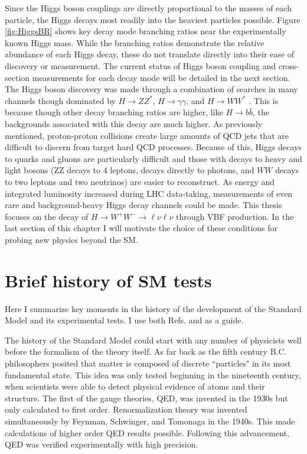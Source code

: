 Since the Higgs boson couplings are directly proportional to the masses of each particle, the Higgs decays most readily into the heaviest particles possible. Figure \ref{fig:HiggsBR} shows key decay mode branching ratios near the experimentally known Higgs mass. While the branching ratios demonstrate the relative abundance of each Higgs decay, these do not translate directly into their ease of discovery or measurement. The current status of Higgs boson coupling and cross-section measurements for each decay mode will be detailed in the next section. The Higgs boson discovery was made through a combination of searches in many channels though dominated by $H\rightarrow ZZ^*$, $H\rightarrow\gamma\gamma$, and $H\rightarrow WW^*$ \cite{Higgsdiscovery}. This is because though other decay branching ratios are higher, like $H\rightarrow b\bar{b}$, the backgrounds associated with this decay are much higher. As previously mentioned, proton-proton collisions create large amounts of QCD jets that are difficult to discern from target hard QCD processes. Because of this, Higgs decays to quarks and gluons are particularly difficult and those with decays to heavy and light bosons (ZZ decays to 4 leptons, decays directly to photons, and $WW$ decays to two leptons and two neutrinos) are easier to reconstruct. As energy and integrated luminosity increased during LHC data-taking, measurements of even rare and background-heavy Higgs decay channels could be made.  This thesis focuses on the decay of $H\rightarrow W^+W^-\rightarrow \ell\nu\ell\nu$ through VBF production. In the last section of this chapter I will motivate the choice of these conditions for probing new physics beyond the SM.   

\section{Brief history of SM tests}
Here I summarize key moments in the history of the development of the Standard Model and its experimental tests. I use both Refs. \cite{Kibble} and \cite{HistoryBook} as a guide.

The history of the Standard Model could start with any number of physicists well before the formalism of the theory itself. As far back as the fifth century B.C. philosophers posited that matter is composed of discrete ``particles" in its most fundamental state. This idea was only tested beginning in the nineteenth century, when scientists were able to detect physical evidence of atoms and their structure. The first of the gauge theories, QED, was invented in the 1930s but only calculated to first order. Renormalization theory was invented simultaneously by Feynman, Schwinger, and Tomonaga in the 1940s. This made calculations of higher order QED results possible. Following this advancement, QED was verified experimentally with high precision. 

